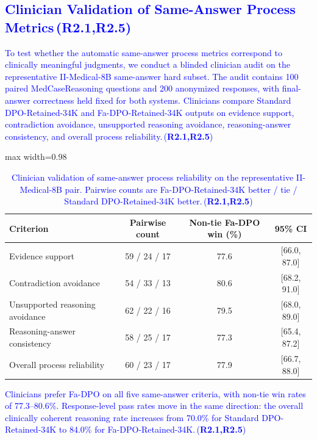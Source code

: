 \documentclass[a4paper,fleqn,doubleblind]{cas-sc}
\DeclareRobustCommand{\added}[1]{\textcolor{blue}{#1}}
\DeclareRobustCommand{\revtag}[1]{\textcolor{blue}{\scriptsize\,(\textbf{#1})}}
\begin{document}
\subsection{\added{Clinician Validation of Same-Answer Process Metrics}\revtag{R2.1,R2.5}}
\label{app:same_answer_clinician_details}

\added{To test whether the automatic same-answer process metrics correspond to clinically meaningful judgments, we conduct a blinded clinician audit on the representative II-Medical-8B same-answer hard subset. The audit contains 100 paired MedCaseReasoning questions and 200 anonymized responses, with final-answer correctness held fixed for both systems. Clinicians compare Standard DPO-Retained-34K and Fa-DPO-Retained-34K outputs on evidence support, contradiction avoidance, unsupported reasoning avoidance, reasoning-answer consistency, and overall process reliability.}\revtag{R2.1,R2.5}

\begin{table}[htbp]
    \centering
    \footnotesize
    \caption{\added{Clinician validation of same-answer process reliability on the representative II-Medical-8B pair. Pairwise counts are Fa-DPO-Retained-34K better / tie / Standard DPO-Retained-34K better.}\revtag{R2.1,R2.5}}
    \label{tab:same_answer_clinician_validation}
    \begin{adjustbox}{max width=0.98\textwidth}
    \begingroup\color{blue}
    \begin{tabular}{lccc}
        \toprule
        \textbf{Criterion} & \textbf{Pairwise count} & \textbf{Non-tie Fa-DPO win (\%)} & \textbf{95\% CI} \\
        \midrule
        Evidence support & 59 / 24 / 17 & 77.6 & [66.0, 87.0] \\
        Contradiction avoidance & 54 / 33 / 13 & 80.6 & [68.2, 91.0] \\
        Unsupported reasoning avoidance & 62 / 22 / 16 & 79.5 & [68.0, 89.0] \\
        Reasoning-answer consistency & 58 / 25 / 17 & 77.3 & [65.4, 87.2] \\
        Overall process reliability & 60 / 23 / 17 & 77.9 & [66.7, 88.0] \\
        \bottomrule
    \end{tabular}
    \endgroup
    \end{adjustbox}
\end{table}

\added{Clinicians prefer Fa-DPO on all five same-answer criteria, with non-tie win rates of 77.3--80.6\%. Response-level pass rates move in the same direction: the overall clinically coherent reasoning rate increases from 70.0\% for Standard DPO-Retained-34K to 84.0\% for Fa-DPO-Retained-34K.}\revtag{R2.1,R2.5}
\end{document}
